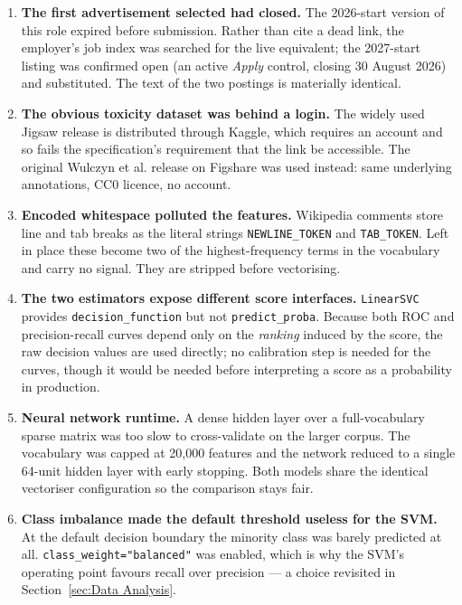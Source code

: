 \begin{enumerate}
    \item \textbf{The first advertisement selected had closed.} The 2026-start version of
    this role expired before submission. Rather than cite a dead link, the employer's job
    index was searched for the live equivalent; the 2027-start listing was confirmed open
    (an active \emph{Apply} control, closing 30 August 2026) and substituted. The text of
    the two postings is materially identical.

    \item \textbf{The obvious toxicity dataset was behind a login.} The widely used Jigsaw
    release is distributed through Kaggle, which requires an account and so fails the
    specification's requirement that the link be accessible. The original Wulczyn et al.
    release on Figshare was used instead: same underlying annotations, CC0 licence, no
    account.

    \item \textbf{Encoded whitespace polluted the features.} Wikipedia comments store line
    and tab breaks as the literal strings \texttt{NEWLINE\_TOKEN} and \texttt{TAB\_TOKEN}.
    Left in place these become two of the highest-frequency terms in the vocabulary and
    carry no signal. They are stripped before vectorising.

    \item \textbf{The two estimators expose different score interfaces.}
    \texttt{LinearSVC} provides \texttt{decision\_function} but not
    \texttt{predict\_proba}. Because both ROC and precision-recall curves depend only on
    the \emph{ranking} induced by the score, the raw decision values are used directly;
    no calibration step is needed for the curves, though it would be needed before
    interpreting a score as a probability in production.

    \item \textbf{Neural network runtime.} A dense hidden layer over a full-vocabulary
    sparse matrix was too slow to cross-validate on the larger corpus. The vocabulary was
    capped at 20,000 features and the network reduced to a single 64-unit hidden layer
    with early stopping. Both models share the identical vectoriser configuration so the
    comparison stays fair.

    \item \textbf{Class imbalance made the default threshold useless for the SVM.} At the
    default decision boundary the minority class was barely predicted at all.
    \texttt{class\_weight="balanced"} was enabled, which is why the SVM's operating point
    favours recall over precision --- a choice revisited in
    Section~\ref{sec:Data Analysis}.
\end{enumerate}

